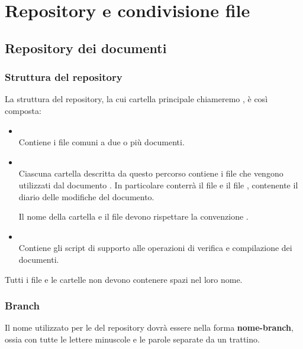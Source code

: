 \section{Repository e condivisione file}

\subsection{Repository dei documenti}

\subsubsection{Struttura del repository}

La struttura del repository, la cui cartella principale chiameremo , è così composta:
\begin{itemize}
 \item \textbf{} \\
	Contiene i file comuni a due o più documenti.

 \item \textbf{} \\
	Ciascuna cartella descritta da questo percorso contiene i file che vengono utilizzati dal documento . In particolare conterrà il file  e il file , contenente il diario delle modifiche del documento.
	
	Il nome della cartella  e il file  devono rispettare la convenzione .

 \item \textbf{} \\
	Contiene gli script di supporto alle operazioni di verifica e compilazione dei documenti.
\end{itemize}

Tutti i file e le cartelle non devono contenere spazi nel loro nome.

\subsubsection{Branch}

Il nome utilizzato per le  del repository dovrà essere nella forma \textbf{nome-branch}, ossia con tutte le lettere minuscole e le parole separate da un trattino.

